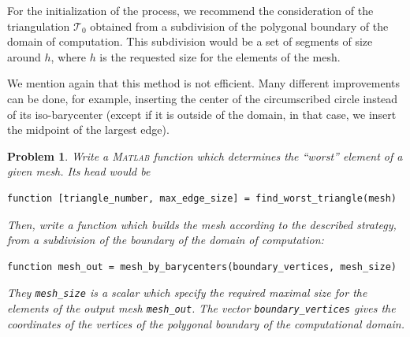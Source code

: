 \documentclass[11pt,a4paper,center,notitlepage]{article}
\numberwithin{equation}{section}
\newtheorem{prob}{Problem}[section]
\begin{document}
For the initialization of the process, we recommend the consideration of the triangulation $\mathcal{T}_0$ obtained from a subdivision of the polygonal boundary of the domain of computation. This subdivision would be a set of segments of size around $h$, where $h$ is the requested size for the elements of the mesh.

We mention again that this method is not efficient. Many different improvements can be done, for example, inserting the center of the circumscribed circle instead of its iso-barycenter (except if it is outside of the domain, in that case, we insert the midpoint of the largest edge).

\begin{prob}
Write a \textsc{Matlab} function which determines the ``worst'' element of a given mesh. Its head would be
\begin{verbatim}
function [triangle_number, max_edge_size] = find_worst_triangle(mesh)
\end{verbatim}
Then, write a function which builds the mesh according to the described strategy, from a subdivision of the boundary of the domain of computation:
\begin{verbatim}
function mesh_out = mesh_by_barycenters(boundary_vertices, mesh_size)
\end{verbatim}
They \verb|mesh_size| is a scalar which specify the required maximal size for the elements of the output mesh \verb|mesh_out|. The vector \verb|boundary_vertices| gives the coordinates of the vertices of the polygonal boundary of the computational domain.
\end{prob}
\end{document}

